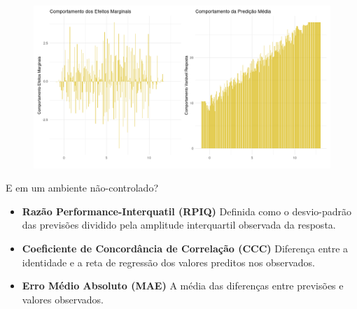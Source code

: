 \documentclass{beamer} %
\newcommand{\1}{\mathbb{I}}
\begin{document}
\begin{frame}
    \begin{figure}[H]
    \centering
    
    \includegraphics[scale = .35]{imagens/exemplo_freddy_efeitos_marginais.png}

\end{figure}

\end{frame}






\begin{frame}
E em um ambiente não-controlado? 

\end{frame}

\begin{frame}
    \begin{itemize}
    \item \textbf{Razão Performance-Interquatil (RPIQ)} \newline
    Definida como o desvio-padrão das previsões dividido pela amplitude interquartil observada da resposta.
    
    \item \textbf{Coeficiente de Concordância de Correlação (CCC)} \newline
    Diferença entre a identidade e a reta de regressão dos valores preditos nos observados. 
    
    \item \textbf{Erro Médio Absoluto (MAE)} \newline
    A média das diferenças entre previsões e valores observados. 
    

\end{itemize}
\end{frame}
\end{document}
